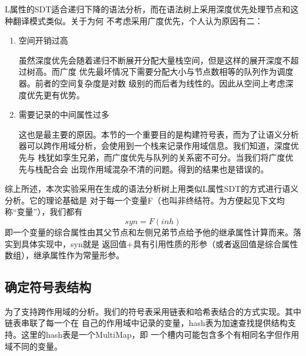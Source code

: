 \documentclass[twocolumn]{article}
\begin{document}
L属性的SDT适合递归下降的语法分析，而在语法树上采用深度优先处理节点和这种翻译模式类似。关于为何
不考虑采用广度优先，个人认为原因有二：
\begin{enumerate}
    \item 空间开销过高

          虽然深度优先会随着递归不断展开分配大量栈空间，但是这样的展开深度不超过树高。而广度
          优先最坏情况下需要分配大小与节点数相等的队列作为调度器。前者的空间复杂度是对数
          级别的而后者为线性的。因此从空间上考虑深度优先更有优势。
    \item 需要记录的中间属性过多

          这也是最主要的原因。本节的一个重要目的是构建符号表，而为了让语义分析
          器可以跨作用域分析，会使用到一个栈来记录作用域信息。我们知道，深度优先与
          栈犹如孪生兄弟，而广度优先与队列的关系密不可分。当我们将广度优先与栈配合会
          出现作用域混杂不清的问题。得到的结果也是错误的。
\end{enumerate}

综上所述，本次实验采用在生成的语法分析树上用类似L属性SDT的方式进行语义分析。它的理论基础是
对于每一个变量F（也叫非终结符。为方便起见下文均称“变量”），我们都有
$$
    syn = F(inh)
$$
即一个变量的综合属性由其父节点和左侧兄弟节点给予他的继承属性计算而来。落实到具体实现中，syn就是
返回值+具有引用性质的形参（或者返回值是综合属性数组），继承属性作为常量形参。

\subsection{确定符号表结构}

为了支持跨作用域的分析。我们的符号表采用链表和哈希表结合的方式实现。其中链表串联了每一个在
自己的作用域中记录的变量，hash表为加速查找提供结构支持。这里的hash表是一个MultiMap，即
一个槽内可能包含多个有相同名字但作用域不同的变量。
\end{document}
